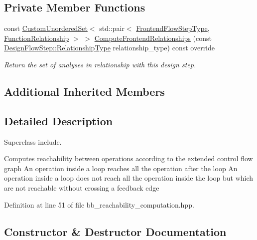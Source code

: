 \subsection*{Private Member Functions}
\begin{DoxyCompactItemize}
\item 
const \hyperlink{classCustomUnorderedSet}{Custom\+Unordered\+Set}$<$ std\+::pair$<$ \hyperlink{frontend__flow__step_8hpp_afeb3716c693d2b2e4ed3e6d04c3b63bb}{Frontend\+Flow\+Step\+Type}, \hyperlink{classFrontendFlowStep_af7cf30f2023e5b99e637dc2058289ab0}{Function\+Relationship} $>$ $>$ \hyperlink{classBBReachabilityComputation_abbfd2e422bc8b4460a89dfe134d800a2}{Compute\+Frontend\+Relationships} (const \hyperlink{classDesignFlowStep_a723a3baf19ff2ceb77bc13e099d0b1b7}{Design\+Flow\+Step\+::\+Relationship\+Type} relationship\+\_\+type) const override
\begin{DoxyCompactList}\small\item\em Return the set of analyses in relationship with this design step. \end{DoxyCompactList}\end{DoxyCompactItemize}
\subsection*{Additional Inherited Members}


\subsection{Detailed Description}
Superclass include. 

Computes reachability between operations according to the extended control flow graph An operation inside a loop reaches all the operation after the loop An operation inside a loop does not reach all the operation inside the loop but which are not reachable without crossing a feedback edge 

Definition at line 51 of file bb\+\_\+reachability\+\_\+computation.\+hpp.



\subsection{Constructor \& Destructor Documentation}
\mbox{\label{classBBReachabilityComputation_a8bbcad478656b3c0c32e561f1e9b9536}} 
